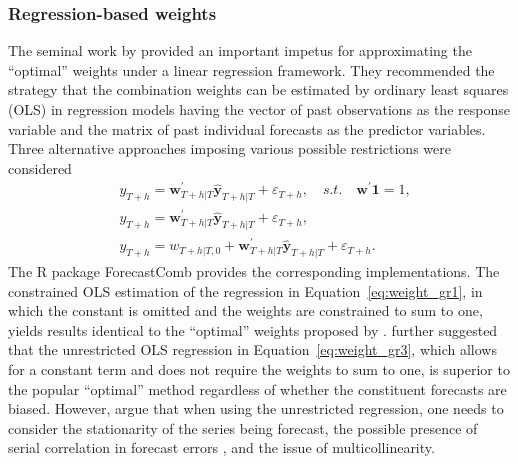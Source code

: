 \documentclass[11pt]{article}
\newcommand{\pkg}[1]{{\normalfont\fontseries{b}\selectfont #1}}
\let\proglang=\textsf
\begin{document}
\subsubsection*{Regression-based weights}

The seminal work by \citet{Granger1984-jc} provided an important impetus for approximating the ``optimal'' weights under a linear regression framework. They recommended the strategy that the combination weights can be estimated by ordinary least squares (OLS) in regression models having the vector of past observations as the response variable and the matrix of past individual forecasts as the predictor variables. Three alternative approaches imposing various possible restrictions were considered
\begin{align}
   & y_{T+h}=\bm{w}_{T+h|T}^{\prime} \hat{\bm{y}}_{T+h|T}+\varepsilon_{T+h}, \quad s.t. \quad \bm{w}^{\prime}\bm{1}=1, \label{eq:weight_gr1} \\
   & y_{T+h}=\bm{w}^{\prime}_{T+h|T} \hat{\bm{y}}_{T+h|T}+\varepsilon_{T+h}, \\
   & y_{T+h}=w_{T+h|T, 0}+\bm{w}_{T+h|T}^{\prime} \hat{\bm{y}}_{T+h|T}+\varepsilon_{T+h}. \label{eq:weight_gr3}
\end{align}
The \proglang{R} package \pkg{ForecastComb} \citep{rForecastComb} provides the corresponding implementations. The constrained OLS estimation of the regression in Equation~\eqref{eq:weight_gr1}, in which the constant is omitted and the weights are constrained to sum to one, yields results identical to the ``optimal'' weights proposed by \citet{Bates1969-yj}. \citet{Granger1984-jc} further suggested that the unrestricted OLS regression in Equation~\eqref{eq:weight_gr3}, which allows for a constant term and does not require the weights to sum to one, is superior to the popular ``optimal'' method regardless of whether the constituent forecasts are biased. However, \citet{De_Menezes2000-vd} argue that when using the unrestricted regression, one needs to consider the stationarity of the series being forecast, the possible presence of serial correlation in forecast errors \citep[see also][]{Diebold1988-sx,Edward_Coulson1993-db}, and the issue of multicollinearity.
\end{document}
